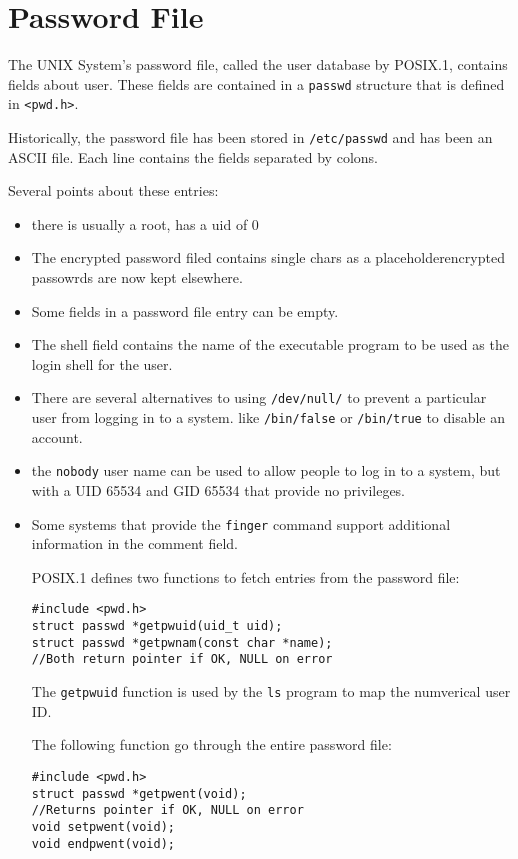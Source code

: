 \documentclass[a4paper,10pt]{book}
\begin{document}
\section{Password File}
The UNIX System's password file, called the user database by POSIX.1, contains
fields about user. These fields are contained in a \verb|passwd| structure that
is defined in \verb|<pwd.h>|.

Historically, the password file has been stored in \verb|/etc/passwd| and has
been an ASCII file. Each line contains the fields separated by colons. 

Several points about these entries:
\begin{itemize}
\item there is usually a root, has a uid of 0
\item The encrypted password filed contains single chars as a
placeholderencrypted passowrds are now kept elsewhere.
\item Some fields in a password file entry can be empty. 
\item The shell field contains the name of the executable program to be used as
the login shell for the user.
\item There are several alternatives to using \verb|/dev/null/| to prevent a
particular user from logging in to a system. like \verb|/bin/false| or
\verb|/bin/true| to disable an account.
\item the \verb|nobody| user name can be used to allow people to log in to a
system, but with a UID 65534 and GID 65534 that provide no privileges.
\item Some systems that provide the \verb|finger| command support additional
information in the comment field.

POSIX.1 defines two functions to fetch entries from the password file:
\begin{verbatim}
#include <pwd.h>
struct passwd *getpwuid(uid_t uid);
struct passwd *getpwnam(const char *name); 
//Both return pointer if OK, NULL on error
\end{verbatim}
The \verb|getpwuid| function is used by the \verb|ls| program to map the
numverical user ID. 

The following function go through the entire password file:
\begin{verbatim}
#include <pwd.h>
struct passwd *getpwent(void);
//Returns pointer if OK, NULL on error
void setpwent(void);
void endpwent(void);
\end{verbatim}
\end{itemize}
\end{document}
